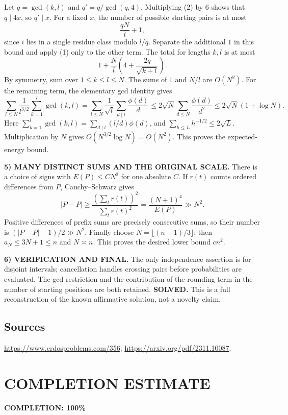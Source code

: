 Let $q=\gcd(k,l)$ and $q'=q/\gcd(q,4)$. Multiplying (2) by $6$ shows that $q\mid4x$, so $q'\mid x$. For a fixed $x$, the number of possible starting pairs is at most
\[
 \frac{qN}{l}+1,
\]
since $i$ lies in a single residue class modulo $l/q$. Separate the additional $1$ in this bound and apply (1) only to the other term. The total for lengths $k,l$ is at most
\[
 1+\frac Nl\left(4+\frac{2q}{\sqrt{k+l}}\right). \tag{3}
\]
By symmetry, sum over $1\le k\le l\le N$. The sums of $1$ and $N/l$ are $O(N^2)$. For the remaining term, the elementary gcd identity gives
\[
 \sum_{l\le N}\frac1{l^{3/2}}\sum_{k=1}^l\gcd(k,l)
 =\sum_{l\le N}\frac1{\sqrt l}\sum_{d\mid l}\frac{\phi(d)}d
 \le2\sqrt N\sum_{d\le N}\frac{\phi(d)}{d^2}
 \le2\sqrt N(1+\log N).
\]
Here $\sum_{k=1}^l\gcd(k,l)=\sum_{d\mid l}(l/d)\phi(d)$, and $\sum_{h\le L}h^{-1/2}\le2\sqrt L$. Multiplication by $N$ gives $O(N^{3/2}\log N)=O(N^2)$. This proves the expected-energy bound.

\noindent\textbf{5) MANY DISTINCT SUMS AND THE ORIGINAL SCALE.}
There is a choice of signs with $E(P)\le C N^2$ for one absolute $C$. If $r(t)$ counts ordered differences from $P$, Cauchy--Schwarz gives
\[
 |P-P|\ge\frac{(\sum_t r(t))^2}{\sum_t r(t)^2}
 =\frac{(N+1)^4}{E(P)}\gg N^2.
\]
Positive differences of prefix sums are precisely consecutive sums, so their number is $(|P-P|-1)/2\gg N^2$. Finally choose
$N=\lfloor(n-1)/3\rfloor$; then $a_N\le3N+1\le n$ and $N\asymp n$. This proves the desired lower bound $cn^2$.

\noindent\textbf{6) VERIFICATION AND FINAL.}
The only independence assertion is for disjoint intervals; cancellation handles crossing pairs before probabilities are evaluated. The gcd restriction and the contribution of the rounding term in the number of starting positions are both retained. \textbf{SOLVED.} This is a full reconstruction of the known affirmative solution, not a novelty claim.

\subsection*{Sources}
\url{https://www.erdosproblems.com/356}; \url{https://arxiv.org/pdf/2311.10087}.

\section{COMPLETION ESTIMATE}
\textbf{COMPLETION: 100\%}
